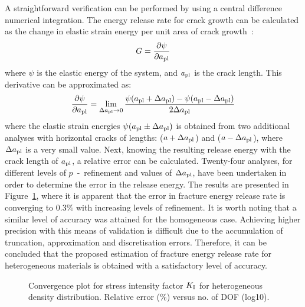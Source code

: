 \documentclass[twocolumn]{svjour3}
\begin{document}
A straightforward verification can be performed by using a central difference numerical integration. The energy release rate for crack growth can be calculated as the change in elastic strain energy per unit area of crack growth~\cite{Griffith163}:
\begin{equation}
G = \frac{\partial \psi}{\partial a_{\rm {pl}}}
\end{equation}
where $\psi$ is the elastic energy of the system, and $a_{\rm{pl}}$ is the crack length. This derivative can be approximated as:
\begin{equation}
 \frac{\partial \psi}{\partial a_{\rm {pl}}} = \lim_{\Delta a_{\rm {pl}} \to 0} \frac{\psi(a_{\rm {pl}} + \Delta a_{\rm {pl}}) - \psi(a_{\rm {pl}} -\Delta a_{\rm {pl}})}{2\Delta a_{\rm {pl}}}
\end{equation}
where the elastic strain energies $\psi(a_{\rm {pl}} \pm \Delta a_{\rm {pl}})$ is obtained from two additional analyses with horizontal cracks of lengths: ($a + \Delta a_{\rm {pl}}$) and ($a - \Delta a_{\rm {pl}}$), where $\Delta a_{\rm {pl}}$ is a very small value. 
Next, knowing the resulting release energy with the crack length of $a_{\rm {pl}}$, a relative error can be calculated. 
Twenty-four analyses, for different levels of $p$~-~refinement and values of $\Delta a_{\rm {pl}}$, have been undertaken in order to determine the error in the release energy. 
The results are presented in Figure~\ref{fig:covergencefdm}, where it is apparent that the error in fracture energy release rate is converging to 0.3\% 
with increasing levels of refinement. It is worth noting that a similar level of accuracy was attained for the homogeneous case.  Achieving higher precision with this means of validation is difficult due to the accumulation of truncation, approximation and discretisation errors.
Therefore, it can be concluded that the proposed estimation of fracture energy release rate for heterogeneous materials is obtained with a satisfactory level of accuracy.
\begin{figure}[h]
	\centering
	\caption{Convergence plot for stress intensity factor $K_{\rm I}$ for heterogeneous density distribution. Relative error (\%) versus no. of DOF (log10).}
	\label{fig:covergencefdm}
\end{figure}
\end{document}

